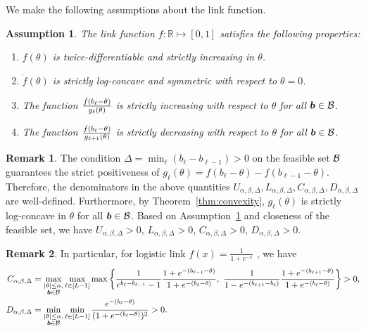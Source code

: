 \documentclass[11pt]{article}
\theoremstyle{plain}
\newtheorem{assumption}{Assumption}
\theoremstyle{definition}
\newtheorem{rmk}{Remark}
\begin{document}
We make the following assumptions about the link function.
\begin{assumption}\label{ass:joint}
The link function $f\colon \mathbb{R}\mapsto [0,1]$ satisfies the following properties:
 \begin{enumerate} 
\item $f(\theta)$ is twice-differentiable and strictly increasing in $\theta$.
\item $\dot{f}(\theta)$ is strictly log-concave and symmetric with respect to $\theta=0$.
\item The function ${\dot{f}(b_\ell-\theta)\over g_\ell(\theta)}$ is strictly increasing with respect to $\theta$ for all $\bm{b}\in\mathcal{B}$.
\item The function ${\dot{f}(b_\ell-\theta)\over g_{\ell+1}(\theta)}$ is strictly decreasing with respect to $\theta$ for all $\bm{b}\in\mathcal{B}$.
 \end{enumerate} 
\end{assumption}

\begin{rmk}
The condition $\Delta=\min_{\ell}(b_{\ell}-b_{\ell-1})>0$ on the feasible set $\mathcal{B}$ guarantees the strict positiveness of $g_{\ell}(\theta)=f(b_{\ell}-\theta)-f(b_{\ell-1}-\theta)$. Therefore, the denominators in the above quantities $U_{\alpha,\beta,\Delta}, L_{\alpha,\beta,\Delta}, C_{\alpha,\beta,\Delta}, D_{\alpha,\beta,\Delta}$ are well-defined. Furthermore, by Theorem~\ref{thm:convexity}, $g_\ell(\theta)$ is strictly log-concave in $\theta$ for all $\bm{b}\in\mathcal{B}$. Based on Assumption~\ref{ass:joint} and closeness of the feasible set, we have $U_{\alpha,\beta,\Delta}>0$, $L_{\alpha,\beta,\Delta}>0$, $C_{\alpha,\beta,\Delta}>0$, $D_{\alpha,\beta,\Delta}>0$.
\end{rmk}
\begin{rmk}
In particular, for logistic link $f(x) = \frac{1}{1+e^{-x}}$ , we have
\begin{align}
C_{\alpha,\beta,\Delta}&=\max_{\substack{|\theta|\leq \alpha,\\ \bm{b}\in\mathcal{B}}}\max_{\ell\in[L-1]}\max
\left\{
{ 1\over e^{b_{\ell}-b_{\ell-1}}-1} { 1+e^{-(b_{\ell-1}-\theta)} \over 1+e^{-(b_{\ell}-\theta)}},\
{ 1\over 1-e^{-(b_{\ell+1}-b_{\ell})}} { 1+e^{-(b_{\ell+1}-\theta)} \over 1+e^{-(b_{\ell}-\theta)}}
\right\}>0,
\\
D_{\alpha,\beta,\Delta}&=\min_{\substack{|\theta|\leq \alpha,\\ \bm{b}\in\mathcal{B}}}\min_{\ell\in[L-1]} {e^{-(b_\ell-\theta)}\over (1+e^{-(b_\ell-\theta)})^2}>0.
\end{align}
\end{rmk}
\end{document}
